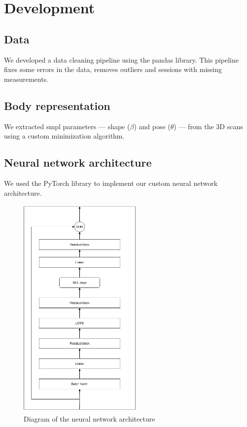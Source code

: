 
\chapter{Development}\label{development}
\section{Data}

We developed a data cleaning pipeline using the pandas library. This pipeline
fixes some errors in the data, removes outliers and sessions with missing
measurements.

\section{Body representation}

We extracted \gls{smpl} parameters --- shape ($\beta$) and pose ($\theta$) ---
from the 3D scans using a custom minimization algorithm.

\section{Neural network architecture}

We used the PyTorch library to implement our custom neural network
architecture.

\begin{figure}
    \centering
    \includegraphics[width=6cm]{files/nn_diagram}
    \caption{Diagram of the neural network architecture}
\end{figure}

